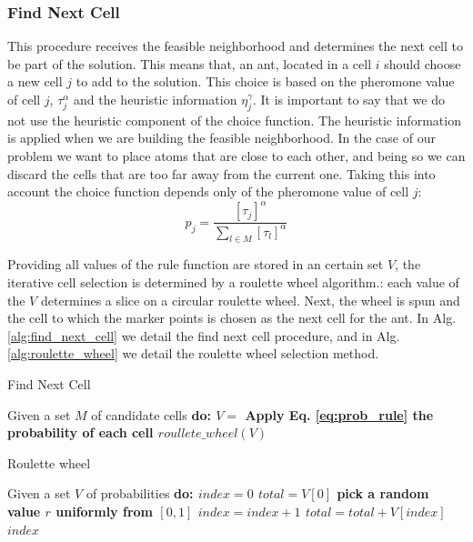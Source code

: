 		\subsubsection*{Find Next Cell}	
		This procedure receives the feasible neighborhood and determines the next cell to be part of the solution. This means that, an ant, located in a cell $i$ should choose a new cell $j$ to add to the solution. This choice is based on the pheromone value of cell $j$, $\tau_{j}^{\alpha}$ and the heuristic information $\eta_{j}^\gamma$. It is important to say that we do not use the heuristic component of the choice function. The heuristic information is applied when we are building the feasible neighborhood. In the case of our problem we want to place atoms that are close to each other, and being so we can discard the cells that are too far away from the current one. 
		Taking this into account the choice function depends only of the pheromone value of cell $j$:
		\begin{equation}
			\label{eq:prob_rule}
			p_j = \frac{[\tau_j]^\alpha} {\sum_{l \in M} [\tau_l]^\alpha}
		\end{equation}
		
		Providing all values of the rule function are stored in an certain set $V$, the iterative cell selection is determined by a roulette wheel algorithm.: each value of the $V$ determines a slice on a circular roulette wheel. Next, the wheel is spun and the cell to which the marker points is chosen as the next cell for the ant. 
		In Alg. \ref{alg:find_next_cell} we detail the find next cell procedure, and in Alg. \ref{alg:roulette_wheel} we detail the roulette wheel selection method. 
		
			\begin{algorithm}
				\caption{Find Next Cell}
				\label{alg:find_next_cell}
				\begin{algorithmic}
				\STATE Given a set $M$ of candidate cells \bf{do}:
						\STATE $V =$ Apply Eq. \ref{eq:prob_rule} the probability of each cell
				\ENDFOR
				\RETURN $roullete\_wheel(V)$
				\end{algorithmic}
			\end{algorithm}
			
			\begin{algorithm}
				\caption{Roulette wheel}
				\label{alg:roulette_wheel}
				\begin{algorithmic}
				\STATE Given a set $V$ of probabilities \bf{do}:
				\STATE $index = 0$
				\STATE $total = V[0]$
				\STATE pick a random value $r$ uniformly from $[0,1]$
				\WHILE{$total < r$}
					\STATE $index = index + 1$
					\STATE $total = total + V[index]$		
				\ENDWHILE
				\RETURN $index$
				\end{algorithmic}
			\end{algorithm}
			
